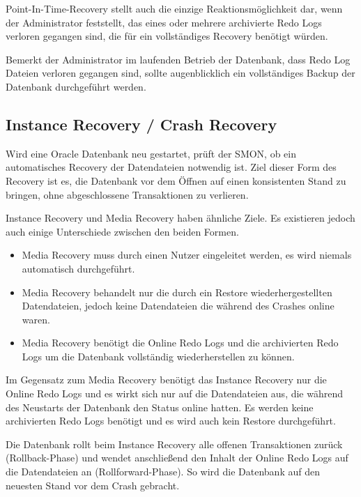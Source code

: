           Point-In-Time-Recovery stellt auch die einzige Reaktionsm\"oglichkeit dar, wenn der Administrator feststellt, das eines oder mehrere archivierte Redo Logs verloren gegangen sind, die f\"ur ein vollst\"andiges Recovery ben\"otigt w\"urden.

          \begin{merke}
            Bemerkt der Administrator im laufenden Betrieb der Datenbank, dass Redo Log Dateien verloren gegangen sind, sollte augenblicklich ein vollst\"andiges Backup der Datenbank durchgef\"uhrt werden.
          \end{merke}
      \subsection{Instance Recovery / Crash Recovery}
        Wird eine Oracle Datenbank neu gestartet, pr\"uft der SMON, ob ein automatisches Recovery der Datendateien notwendig ist. Ziel dieser Form des Recovery ist es, die Datenbank vor dem \"Offnen auf einen konsistenten Stand zu bringen, ohne abgeschlossene Transaktionen zu verlieren.

        Instance Recovery und Media Recovery haben \"ahnliche Ziele. Es existieren jedoch auch einige Unterschiede zwischen den beiden Formen.
        \begin{itemize}
          \item Media Recovery muss durch einen Nutzer eingeleitet werden, es wird niemals automatisch durchgef\"uhrt.
          \item Media Recovery behandelt nur die durch ein Restore wiederhergestellten Datendateien, jedoch keine Datendateien die w\"ahrend des Crashes online waren.
          \item Media Recovery ben\"otigt die Online Redo Logs und die archivierten Redo Logs um die Datenbank vollst\"andig wiederherstellen zu k\"onnen.
        \end{itemize}
        Im Gegensatz zum Media Recovery ben\"otigt das Instance Recovery nur die Online Redo Logs und es wirkt sich nur auf die Datendateien aus, die w\"ahrend des Neustarts der Datenbank den Status online hatten. Es werden keine archivierten Redo Logs ben\"otigt und es wird auch kein Restore durchgef\"uhrt.

        Die Datenbank rollt beim Instance Recovery alle offenen Transaktionen zur\"uck (Rollback-Phase) und wendet anschlie\ss{}end den Inhalt der Online Redo Logs auf die Datendateien an (Rollforward-Phase). So wird die Datenbank auf den neuesten Stand vor dem Crash gebracht.
